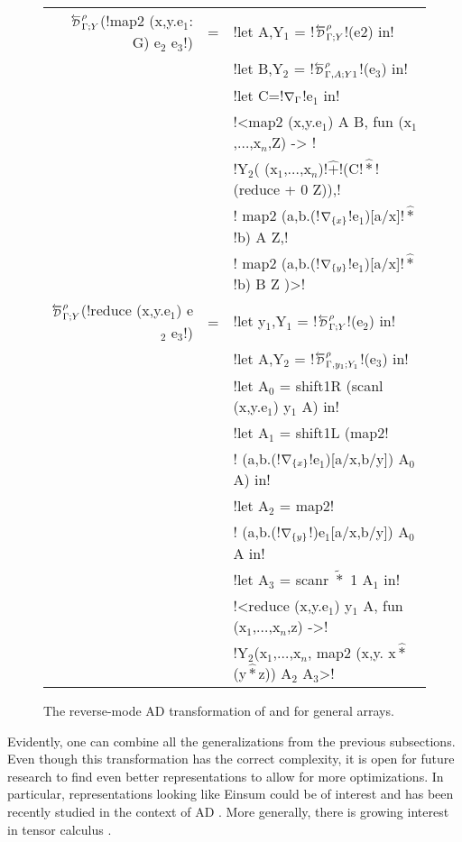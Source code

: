 \begin{figure}
\begin{center}
\begin{tabular}{|r c l|}
\hline
    $\directD{\rho}{\Gamma}{Y}$(!map2 (x,y.e$_1$: G) e$_2$ e$_3$!) &=&  
    !let A,Y$_1$ = !$\directD{\rho}{\Gamma}{Y}$!(e2) in! \\
    && !let B,Y$_2$ = !$\directD{\rho}{\Gamma,A}{Y1}$!(e$_3$) in! \\
    && !let C=!$\nabla_{\Gamma}$!e$_1$ in!\\
    && !<map2 (x,y.e$_1$) A B, fun (x$_1$,$\ldots$,x$_n$,Z) -> !\\
    && !Y$_2$( (x$_1$,$\ldots$,x$_n$)!$\widehat{+}$!(C!$\widehat{*}$!(reduce + 0 Z)),!\\
    && \quad\quad! map2 (a,b.(!$\nabla_{\{x\}}$!e$_1$)[a/x]!$\widehat{*}$!b) A Z,!\\
    && \quad\quad! map2 (a,b.(!$\nabla_{\{y\}}$!e$_1$)[a/x]!$\widehat{*}$!b) B Z )>!\\
    $\directD{\rho}{\Gamma}{Y}$(!reduce (x,y.e$_{1}$) e$_{2}$ e$_{3}$!) &=&
    !let y$_{1}$,Y$_{1}$ = !$\directD{\rho}{\Gamma}{Y}$!(e$_{2}$) in! \\
    && !let A,Y$_{2}$ = !$\directD{\rho}{\Gamma,y_1}{Y_1}$!(e$_{3}$) in! \\
    && !let A$_{0}$ = shift1R (scanl (x,y.e$_{1}$) y$_{1}$ A) in! \\
    && !let A$_{1}$ = shift1L (map2! \\ 
    && !      (a,b.(!$\nabla_{\{x\}}$!e$_{1}$)[a/x,b/y]) A$_{0}$ A) in! \\
    && !let A$_{2}$ = map2! \\
    && !      (a,b.(!$\nabla_{\{y\}}$!)e$_{1}$[a/x,b/y]) A$_{0}$ A in! \\
    && !let A$_{3}$ = scanr $\widetilde{*}$ 1 A$_{1}$ in! \\
    && !<reduce (x,y.e$_{1}$) y$_{1}$ A, fun (x$_{1}$,$\ldots$,x$_n$,z) ->! \\
    && !Y$_{2}$(x$_{1}$,$\ldots$,x$_n$, map2 (x,y. x$\widehat{*}$(y$\widehat{*}$z)) A$_{2}$ A$_{3}$>! \\ \hline
\end{tabular}
\end{center}
\caption{The reverse-mode AD transformation of  and  for general arrays.}
\label{fig:lift_gen_arr}
\end{figure}

Evidently, one can combine all the generalizations from the previous subsections.
Even though this transformation has the correct complexity, it is open for future research to find
even better representations to allow for more optimizations. 
In particular, representations looking like Einsum \cite{van2011numpy} could be of interest 
and has been recently studied in the context of AD \cite{laue2018computing,laue2020simple}.
More generally, there is growing interest in tensor calculus \cite{liao2019differentiable,bernstein2020differentiating}.

